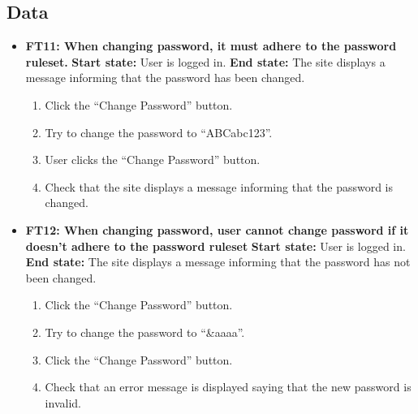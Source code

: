 \documentclass{article}
\begin{document}
\subsection{Data}
\begin{itemize}
		\item \textbf{FT11: When changing password, it must adhere to the password ruleset.} \newline
		\textbf{Start state:} User is logged in. \newline
		\textbf{End state:} The site displays a message informing that the password has been changed.
		\begin{enumerate}
			\item Click the “Change Password” button.
			\item Try to change the password to “ABCabc123”.
			\item User clicks the “Change Password” button.
			\item Check that the site displays a message informing that the password is changed.
		\end{enumerate}
		
			\item \textbf{FT12: When changing password, user cannot change password if it doesn't adhere to the password ruleset} \newline
		\textbf{Start state:} User is logged in. \newline
		\textbf{End state:} The site displays a message informing that the password has not been changed.
		\begin{enumerate}
			\item Click the “Change Password” button.
			\item Try to change the password to “\&aaaa”.
			\item Click the “Change Password” button.
			\item Check that an error message is displayed saying that the new password is invalid.
		\end{enumerate}
\end{itemize}
\end{document}
